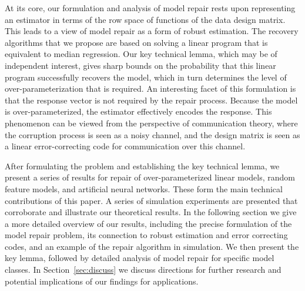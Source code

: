At its core, our formulation and analysis of model repair rests upon representing an estimator in terms of the row space of functions of the data design matrix. This leads to a view of model repair as a form of robust estimation. The recovery algorithms that we propose are based on solving a linear program that is equivalent to median regression. Our key technical lemma, which may be of independent interest, gives sharp bounds on the probability that this linear program successfully recovers the model, which in turn determines the level of over-parameterization that is required. An interesting facet of this formulation is that the response vector is not required by the repair process. Because the model is over-parameterized, the estimator effectively encodes the response. This phenomenon can be viewed from the perspective of communication theory, where the corruption process is seen as a noisy channel, and the design matrix is seen as a linear error-correcting code for communication over this channel.

After formulating the problem  and establishing the key technical lemma, we present a series of results for
repair of over-parameterized linear models, random feature models, and artificial neural networks. These form the main technical contributions of this paper.
A series of simulation experiments are presented that corroborate and illustrate our theoretical results.
In the following section we give a more detailed overview of our results, including the precise formulation of the model repair problem, its connection to robust estimation and error correcting codes, and an example of the repair algorithm in simulation. We then present the key lemma, followed by detailed analysis of model repair for specific model classes.
In Section~\ref{sec:discuss} we discuss directions for further research and potential implications of our findings for applications.
